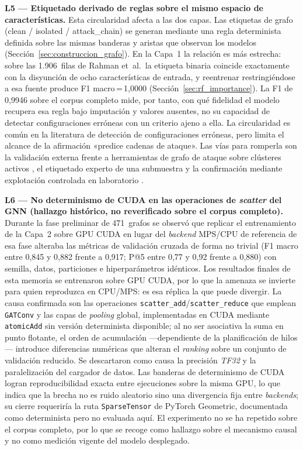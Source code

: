 \textbf{L5 — Etiquetado derivado de reglas sobre el mismo espacio de
características.} Esta circularidad afecta a las dos capas. Las etiquetas de grafo
(clean / isolated / attack\_chain) se generan mediante una regla determinista
definida sobre las mismas banderas y aristas que observan los modelos
(Sección~\ref{sec:construccion_grafo}). En la Capa~1 la relación es más estrecha:
sobre las 1.906~filas de Rahman et~al.\ la etiqueta binaria coincide exactamente
con la disyunción de ocho características de entrada, y reentrenar restringiéndose
a esa fuente produce F1 macro\,=\,1,0000 (Sección~\ref{sec:rf_importance}). La F1
de 0,9946 sobre el corpus completo mide, por tanto, con qué fidelidad el modelo
recupera esa regla bajo imputación y valores ausentes, no su capacidad de detectar
configuraciones erróneas con un criterio ajeno a ella. La circularidad es común en la
literatura de detección de configuraciones erróneas, pero limita el alcance de la
afirmación «predice cadenas de ataque». Las vías para romperla son la validación
externa frente a herramientas de grafo de ataque sobre clústeres activos
\citep{KubeHound2023, IceKube2023}, el etiquetado experto de una submuestra y la
confirmación mediante explotación controlada en laboratorio
\citep{KubernetesGoat}.

\textbf{L6 — No determinismo de CUDA en las operaciones de \textit{scatter} del
\ac{GNN} (hallazgo histórico, no reverificado sobre el corpus completo).} Durante
la fase preliminar de 471~grafos se observó que replicar el entrenamiento de la
Capa~2 sobre GPU CUDA en lugar del \textit{backend} MPS/CPU de referencia de esa
fase alteraba las métricas de validación cruzada de forma no trivial (F1 macro
entre 0,845 y 0,882 frente a 0,917; P@5 entre 0,77 y 0,92 frente a 0,880) con
semilla, datos, particiones e hiperparámetros idénticos. Los resultados finales de
esta memoria se entrenaron sobre GPU CUDA, por lo que la amenaza se invierte para
quien reproduzca en CPU/MPS: es esa réplica la que puede divergir. La causa
confirmada son las operaciones \texttt{scatter\_add}/\texttt{scatter\_reduce} que
emplean \texttt{GATConv} y las capas de \textit{pooling} global, implementadas en
CUDA mediante \texttt{atomicAdd} sin versión determinista disponible; al no ser
asociativa la suma en punto flotante, el orden de acumulación —dependiente de la
planificación de hilos— introduce diferencias numéricas que alteran el
\textit{ranking} sobre un conjunto de validación reducido. Se descartaron como
causa la precisión \textit{TF32} y la paralelización del cargador de datos. Las
banderas de determinismo de CUDA logran reproducibilidad exacta entre ejecuciones
sobre la misma GPU, lo que indica que la brecha no es ruido aleatorio sino una
divergencia fija entre \textit{backends}; su cierre requeriría la ruta
\texttt{SparseTensor} de PyTorch Geometric, documentada como determinista
pero no evaluada aquí. El experimento no se ha repetido sobre el corpus completo,
por lo que se recoge como hallazgo sobre el mecanismo causal y no como medición
vigente del modelo desplegado.

